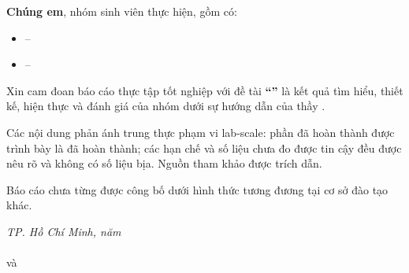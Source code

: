 \begin{declaration}
\setlength{\parskip}{6pt}

\textbf{Chúng em}, nhóm sinh viên thực hiện, gồm có:
\begin{itemize}
    \item [1.] \studentname{} -- \mssv
    \item [2.] \studentnametwo{} -- \mssvtwo
\end{itemize}

Xin cam đoan báo cáo thực tập tốt nghiệp với đề tài \textbf{``\titlethesis''} là kết quả tìm hiểu, thiết kế, hiện thực và đánh giá của nhóm dưới sự hướng dẫn của thầy \textbf{\supervisor}.

Các nội dung phản ánh trung thực phạm vi lab-scale: phần đã hoàn thành được trình bày là đã hoàn thành; các hạn chế và số liệu chưa đo được tin cậy đều được nêu rõ và không có số liệu bịa. Nguồn tham khảo được trích dẫn.

Báo cáo chưa từng được công bố dưới hình thức tương đương tại cơ sở đào tạo khác.

\vspace{2cm}
\begin{flushright}
    \textit{TP. Hồ Chí Minh, năm \yearsubmit} \\
     \\[2.5cm]
    \textbf{\studentname} và \textbf{\studentnametwo}\\
\end{flushright}
\end{declaration}
